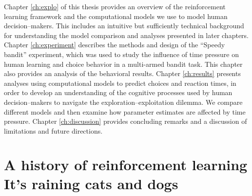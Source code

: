 Chapter \ref{ch:explo} of this thesis provides an overview of the reinforcement learning framework and the computational models we use to model human decision--makers. This includes an intuitive but sufficiently technical background for understanding the model comparison and analyses presented in later chapters. %
Chapter \ref{ch:experiment} describes the methods and design of the ``Speedy bandit'' experiment, which was used to study the influence of time pressure on human learning and choice behavior in a multi-armed bandit task. This chapter also provides an analysis of the behavioral results.
Chapter \ref{ch:results} presents analyses using computational models to predict choices and reaction times, in order to develop an understanding of the cognitive processes used by human decision--makers to navigate the exploration--exploitation dilemma. %
We compare different models and then examine how parameter estimates are affected by time pressure. %
Chapter \ref{ch:discussion} provides concluding remarks and a discussion of limitations and future directions. 



\section[A history of reinforcement learning. It's raining cats and dogs]{A history of reinforcement learning\\ {\large It's raining cats and dogs}} 

